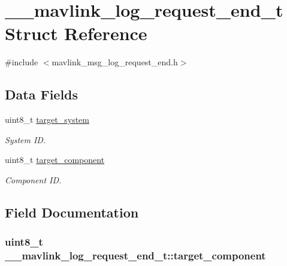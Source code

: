 \hypertarget{struct____mavlink__log__request__end__t}{\section{\+\_\+\+\_\+mavlink\+\_\+log\+\_\+request\+\_\+end\+\_\+t Struct Reference}
\label{struct____mavlink__log__request__end__t}
}


{\ttfamily \#include $<$mavlink\+\_\+msg\+\_\+log\+\_\+request\+\_\+end.\+h$>$}

\subsection*{Data Fields}
\begin{DoxyCompactItemize}
\item 
uint8\+\_\+t \hyperlink{struct____mavlink__log__request__end__t_a90cbedc0127fd1b3316d1a66c6ec24fb}{target\+\_\+system}
\begin{DoxyCompactList}\small\item\em System I\+D. \end{DoxyCompactList}\item 
uint8\+\_\+t \hyperlink{struct____mavlink__log__request__end__t_a5d93c6b37d45862401f7f852310776e5}{target\+\_\+component}
\begin{DoxyCompactList}\small\item\em Component I\+D. \end{DoxyCompactList}\end{DoxyCompactItemize}


\subsection{Field Documentation}
\hypertarget{struct____mavlink__log__request__end__t_a5d93c6b37d45862401f7f852310776e5}{
\subsubsection[{target\+\_\+component}]{\setlength{\rightskip}{0pt plus 5cm}uint8\+\_\+t \+\_\+\+\_\+mavlink\+\_\+log\+\_\+request\+\_\+end\+\_\+t\+::target\+\_\+component}}\label{struct____mavlink__log__request__end__t_a5d93c6b37d45862401f7f852310776e5}


